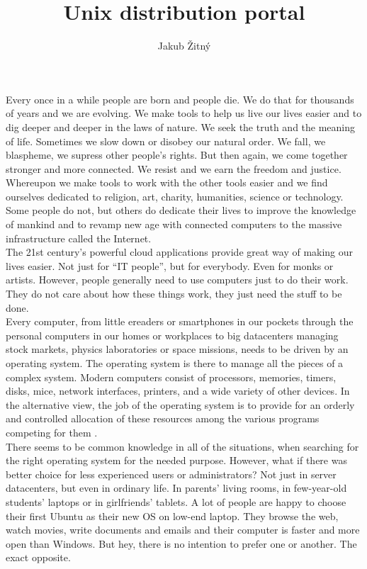 \documentclass[thesis=B,english]{FITthesis}[2013/04/26]
\title{Unix distribution portal}
\author{Jakub Žitný}
\begin{document}

\begin{introduction}
\label{section:introduction}

Every once in a while people are born and people die. We do that for thousands of years and we are evolving. We make tools to help us live our lives easier and to dig deeper and deeper in the laws of nature. We seek the truth and the meaning of life. Sometimes we slow down or disobey our natural order. We fall, we blaspheme, we supress other people’s rights. But then again, we come together stronger and more connected. We resist and we earn the freedom and justice. Whereupon we make tools to work with the other tools easier and we find ourselves dedicated to religion, art, charity, humanities, science or technology. Some people do not, but others do dedicate their lives to improve the knowledge of mankind and to revamp new age with connected computers to the massive infrastructure called the Internet. \\

The 21st century’s powerful cloud applications provide great way of making our lives easier. Not just for ``IT people'', but for everybody. Even for monks or artists. However, people generally need to use computers just to do their work. They do not care about how these things work, they just need the stuff to be done. \\

Every computer, from little ereaders or smartphones in our pockets through the personal computers in our homes or workplaces to big datacenters managing stock markets, physics laboratories or space missions, needs to be driven by an operating system. The operating system is there to manage all the pieces of a complex system. Modern computers consist of processors, memories, timers, disks, mice, network interfaces, printers, and a wide variety of other devices. In the alternative view, the job of the operating system is to provide for an orderly and controlled allocation of these resources among the various programs competing for them \cite{tannenbaum}.\\

There seems to be common knowledge in all of the situations, when searching for the right operating system for the needed purpose. However, what if there was better choice for less experienced users or administrators? Not just in server datacenters, but even in ordinary life. In parents’ living rooms, in few-year-old students’ laptops or in girlfriends’ tablets. A lot of people are happy to choose their first Ubuntu as their new OS on low-end laptop. They browse the web, watch movies, write documents and emails and their computer is faster and more open than Windows. But hey, there is no intention to prefer one or another. The exact opposite. \\


\end{introduction}
\end{document}
